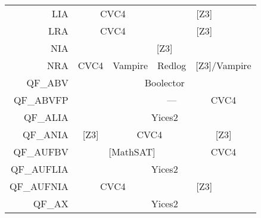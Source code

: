 \begin{table}
{\begin{tabular}{rcccc}
\multicolumn{1}{r|}{LIA}         & \multicolumn{2}{c|}{CVC4}                                           & \multicolumn{2}{c|}{{[}Z3{]}}                                         \\ \cline{2-5}
\multicolumn{1}{r|}{LRA}         & \multicolumn{2}{c|}{CVC4}                                           & \multicolumn{2}{c|}{{[}Z3{]}}                                         \\ \cline{2-5}
\multicolumn{1}{r|}{NIA}         & \multicolumn{4}{c|}{{[}Z3{]}}                                                                                                               \\ \cline{2-5}
\multicolumn{1}{r|}{NRA}         & \multicolumn{1}{c|}{CVC4}     & \multicolumn{1}{c|}{Vampire}        & \multicolumn{1}{c|}{Redlog}   & \multicolumn{1}{c|}{{[}Z3{]}/Vampire} \\ \cline{2-5}
\multicolumn{1}{r|}{QF\_ABV}     & \multicolumn{4}{c|}{Boolector}                                                                                                              \\ \cline{2-5}
QF\_ABVFP                        & \multicolumn{1}{l}{}          & \multicolumn{1}{l}{}                & \multicolumn{1}{|c|}{---}     & \multicolumn{1}{c|}{CVC4}             \\ \cline{2-5}
\multicolumn{1}{r|}{QF\_ALIA}    & \multicolumn{4}{c|}{Yices2}                                                                                                                 \\ \cline{2-5}
\multicolumn{1}{r|}{QF\_ANIA}    & \multicolumn{1}{c|}{{[}Z3{]}} & \multicolumn{2}{c|}{CVC4}                                           & \multicolumn{1}{c|}{{[}Z3{]}}         \\ \cline{2-5}
\multicolumn{1}{r|}{QF\_AUFBV}   & \multicolumn{3}{c|}{{[}MathSAT{]}}                                                                  & \multicolumn{1}{c|}{CVC4}             \\ \cline{2-5}
\multicolumn{1}{r|}{QF\_AUFLIA}  & \multicolumn{4}{c|}{Yices2}                                                                                                                 \\ \cline{2-5}
\multicolumn{1}{r|}{QF\_AUFNIA}  & \multicolumn{2}{c|}{CVC4}                                           & \multicolumn{2}{c|}{{[}Z3{]}}                                         \\ \cline{2-5}
\multicolumn{1}{r|}{QF\_AX}      & \multicolumn{4}{c|}{Yices2}                                                                                                                 \\ \cline{2-5}

\end{tabular}}
\end{table}
